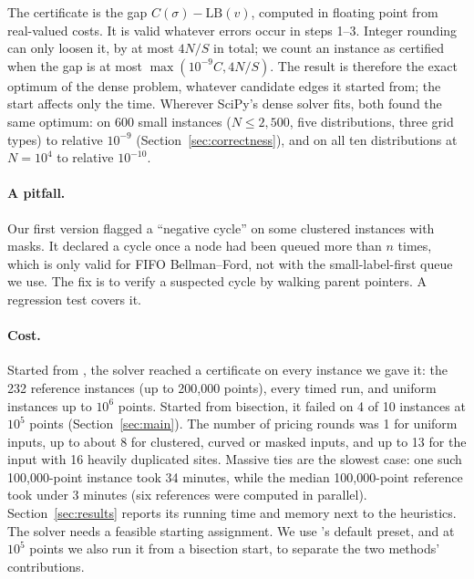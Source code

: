 The certificate is the gap $C(\sigma)-\mathrm{LB}(v)$, computed in floating point from
real-valued costs. It is valid whatever errors occur in steps 1--3. Integer rounding
can only loosen it, by at most $4N/S$ in total; we count an instance as certified when
the gap is at most $\max(10^{-9}C, 4N/S)$. The result is therefore the exact optimum of
the dense problem, whatever candidate edges it started from; the start affects only the
time. Wherever SciPy's dense solver fits, both found the same optimum: on 600 small
instances ($N\le2{,}500$, five distributions, three grid types) to relative $10^{-9}$
(Section~\ref{sec:correctness}), and on all ten distributions at $N=10^4$ to relative
$10^{-10}$.

\paragraph{A pitfall.} Our first version flagged a ``negative cycle'' on some clustered
instances with masks. It declared a cycle once a node had been queued more than $n$
times, which is only valid for FIFO Bellman--Ford, not with the small-label-first queue
we use. The fix is to verify a suspected cycle by walking parent pointers. A regression
test covers it.

\paragraph{Cost.} Started from \ShuffleSnap, the solver reached a certificate on every
instance we gave it: the 232 reference instances (up to 200{,}000 points), every timed run,
and uniform instances up to $10^6$ points. Started from bisection, it failed on 4 of 10
instances at $10^5$ points (Section~\ref{sec:main}). The number of pricing rounds was 1 for
uniform inputs, up to about 8 for clustered, curved or masked inputs, and up to 13 for the
input with 16 heavily duplicated sites. Massive ties are the slowest case: one
such 100{,}000-point instance took 34 minutes, while the median 100{,}000-point
reference took under 3 minutes (six references were computed in parallel).
Section~\ref{sec:results} reports its running time and memory next to the heuristics.
The solver needs a feasible starting assignment. We use \ShuffleSnap's default preset,
and at $10^5$ points we also run it from a bisection start, to separate the two methods'
contributions.
